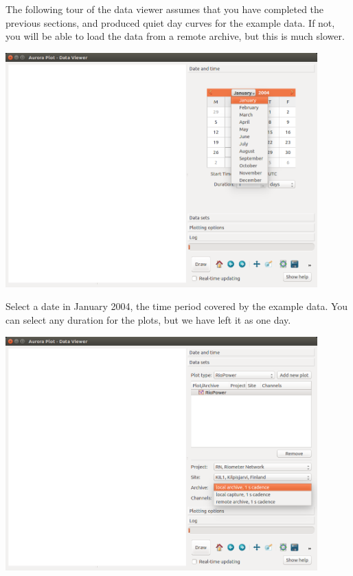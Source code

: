 \documentclass{article}
\begin{document}
The following tour of the data viewer assumes that you have completed the previous sections, and produced quiet day curves for the example data. If not, you will be able to load the data from a remote archive, but this is much slower.

\includegraphics[width=12cm]{images/dv-1.png}

Select a date in January 2004, the time period covered by the example data. You can select any duration for the plots, but we have left it as one day.

\includegraphics[width=12cm]{images/dv-2.png}
\end{document}

